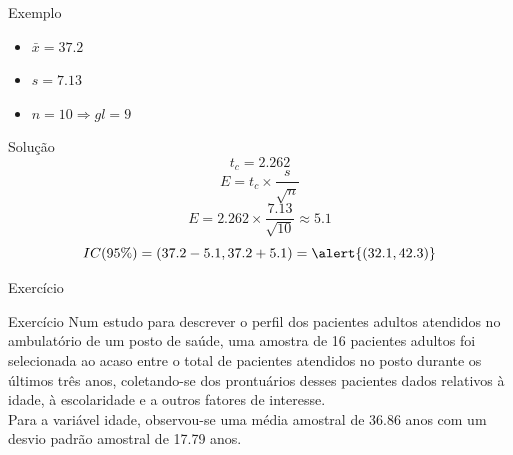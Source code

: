 \documentclass{beamer}
\begin{document}
\begin{frame}{Exemplo}
  \begin{itemize}
  \item $\bar{x}=37.2$
  \item $s=7.13$
  \item $n=10 \Rightarrow gl=9$
  \end{itemize}
  \begin{block}{Solução}
    \begin{displaymath}
      t_c = 2.262
    \end{displaymath}
    \begin{displaymath}
      E = t_c \times \frac{s}{\sqrt{n}}
    \end{displaymath}
    \begin{displaymath}
      E = 2.262 \times \frac{7.13}{\sqrt{10}} \approx 5.1
    \end{displaymath}
    \begin{displaymath}
      IC(95\%) = (37.2 - 5.1 , 37.2 + 5.1 ) = \alert{(32.1 , 42.3)}
    \end{displaymath}
  \end{block}
\end{frame}

\begin{frame}{Exercício}
  \begin{block}{Exercício}
    Num estudo para descrever o perfil dos pacientes adultos atendidos
    no ambulatório de um posto de saúde, uma amostra de \alert{16}
    pacientes adultos foi selecionada ao acaso entre o total de
    pacientes atendidos no posto durante os últimos três anos,
    coletando-se dos prontuários desses pacientes dados relativos à
    idade, à
    escolaridade e a outros fatores de interesse.\\

    Para a variável idade, observou-se uma média amostral de 36.86
    anos com um desvio padrão amostral de 17.79 anos.    
  \end{block}
\end{frame}
\end{document}
